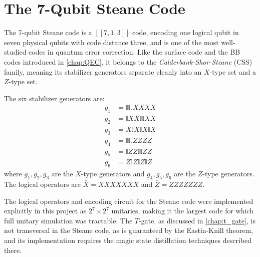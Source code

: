 \section{The 7-Qubit Steane Code}
The 7-qubit Steane code \cite{Steane1996, eczoo_steane} is a $[[7, 1, 3]]$ code, encoding one logical qubit in seven physical qubits with code distance three, and is one of the most well-studied codes in quantum error correction. Like the surface code and the BB codes introduced in \cref{chap:QEC}, it belongs to the \emph{Calderbank-Shor-Steane} (CSS) family, meaning its stabilizer generators separate cleanly into an $X$-type set and a $Z$-type set.

The six stabilizer generators are:
\begin{align*}
g_1 &= \mathbb{I}\mathbb{I}\mathbb{I} X X X X \\
g_2 &= \mathbb{I} X X \mathbb{I}\mathbb{I} X X \\
g_3 &= X \mathbb{I} X \mathbb{I} X \mathbb{I} X \\
g_4 &= \mathbb{I}\mathbb{I}\mathbb{I} Z Z Z Z \\
g_5 &= \mathbb{I} Z Z \mathbb{I}\mathbb{I} Z Z \\
g_6 &= Z \mathbb{I} Z \mathbb{I} Z \mathbb{I} Z
\end{align*}
where $g_1, g_2, g_3$ are the $X$-type generators and $g_4, g_5, g_6$ are the $Z$-type generators. The logical operators are $\bar{X} = XXXXXXX$ and $\bar{Z} = ZZZZZZZ$.


The logical operators and encoding circuit for the Steane code were implemented explicitly in this project as $2^7 \times 2^7$ unitaries, making it the largest code for which full unitary simulation was tractable. The $T$-gate, as discussed in \cref{chap:t_gate}, is not transversal in the Steane code, as is guaranteed by the Eastin-Knill theorem, and its implementation requires the magic state distillation techniques described there.